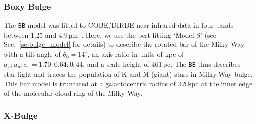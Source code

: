 \documentclass[doublespace,nopageskip]{VTthesis} %
\newcommand{\mrm}[1]{\mathrm{#1}}
\DeclareMathOperator\sech{sech}
\begin{document}
\subsubsection{Boxy Bulge}





The \texttt{BB} model was fitted to COBE/DIRBE near-infrared data in four bands between $1.25$ and $4.9\,\mrm{\mu m}$~\citet{1998ApJ...492..495F}.
%
Here, we use the best-fitting `Model S' (see Sec.~\ref{se:bulge_model} for details) to describe the rotated bar of the Milky Way with a tilt angle of $\theta_0 = 14^{\circ}$, an axis-ratio in units of kpc of $a_x : a_y : a_z = 1.70 : 0.64 : 0:44$, and a scale height of 461\,pc.
%
The \texttt{BB} thus describes star light and traces the population of K and M (giant) stars in Milky Way bulge.
%
This bar model is truncated at a galactocentric radius of $3.5\,\mrm{kpc}$ at the inner edge of the molecular cloud ring of the Milky Way. 


\subsubsection{X-Bulge}
\end{document}
